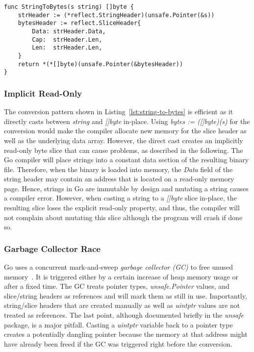\begin{lstlisting}[language=Golang, label=lst:string-to-bytes, caption=Conversion from string to bytes using \unsafe{}, float, belowskip=-1.5em, aboveskip=0em]
func StringToBytes(s string) []byte {
	strHeader := (*reflect.StringHeader)(unsafe.Pointer(&s))
	bytesHeader := reflect.SliceHeader{
		Data: strHeader.Data,
		Cap:  strHeader.Len,
		Len:  strHeader.Len,
	}
	return *(*[]byte)(unsafe.Pointer(&bytesHeader))
}
\end{lstlisting}


\subsubsection*{Implicit Read-Only}

The conversion pattern shown in Listing~\ref{lst:string-to-bytes} is efficient as it directly casts between \textit{string} and \textit{[]byte} in-place. %
Using \textit{bytes := ([]byte)(s)} for the conversion would make the compiler allocate new memory for the slice header as well as the underlying data array.
However, the direct cast creates an implicitly read-only byte slice that can cause problems, as described in the following.
The Go compiler will place strings into a constant data section of the resulting binary file.
Therefore, when the binary is loaded into memory, the \textit{Data} field of the string header may contain an address that is located on a read-only memory page.
Hence, strings in Go are immutable by design and mutating a string causes a compiler error. %
However, when casting a string to a \textit{[]byte} slice in-place, the resulting slice loses the explicit read-only property, and thus, the compiler will not complain about mutating this slice although the program will crash if done so.


\subsubsection*{Garbage Collector Race}

Go uses a concurrent mark-and-sweep \textit{garbage collector (GC)} to free unused memory~\cite{sibiryov2017}.
It is triggered either by a certain increase of heap memory usage or after a fixed time. %
The GC treats pointer types, \textit{unsafe.Pointer} values, and slice/string headers as references and will mark them as still in use. %
Importantly, string/slice headers that are created manually as well as \textit{uintptr} values are not treated as references.
The last point, although documented briefly in the \textit{unsafe} package, is a major pitfall.
Casting a \textit{uintptr} variable back to a pointer type creates a potentially dangling pointer because the memory at that address might have already been freed if the GC was triggered right before the conversion.

